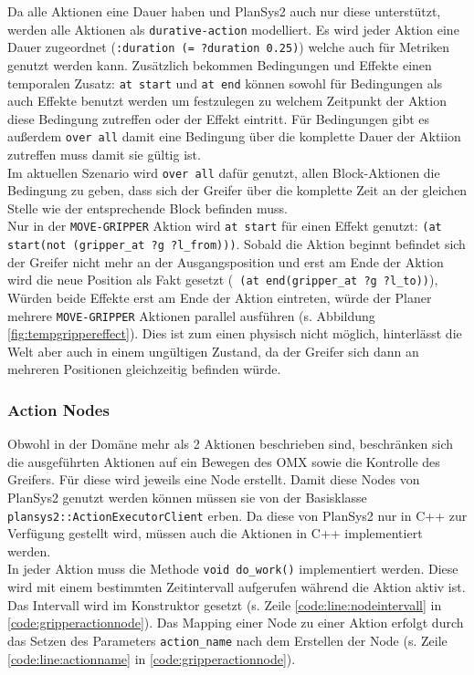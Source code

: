 Da alle Aktionen eine Dauer haben und \ac{PlanSys2} auch nur diese unterstützt, werden alle Aktionen als \verb|durative-action| modelliert. Es wird jeder Aktion eine Dauer zugeordnet (\verb|:duration (= ?duration 0.25)|) welche auch für Metriken genutzt werden kann. Zusätzlich bekommen Bedingungen und Effekte einen temporalen Zusatz: \verb|at start| und \verb|at end| können sowohl für Bedingungen als auch Effekte benutzt werden um festzulegen zu welchem Zeitpunkt der Aktion diese Bedingung zutreffen oder der Effekt eintritt. Für Bedingungen gibt es außerdem \verb|over all| damit eine Bedingung über die komplette Dauer der Aktiion zutreffen muss damit sie gültig ist.\\
Im aktuellen Szenario wird \verb|over all| dafür genutzt, allen Block-Aktionen die Bedingung zu geben, dass sich der Greifer über die komplette Zeit an der gleichen Stelle wie der entsprechende Block befinden muss.\\
Nur in der \verb|MOVE-GRIPPER| Aktion wird \verb|at start| für einen Effekt genutzt: \verb|(at start(not (gripper_at ?g ?l_from)))|. Sobald die Aktion beginnt befindet sich der Greifer nicht mehr an der Ausgangsposition und erst am Ende der Aktion wird die neue Position als Fakt gesetzt (\verb| (at end(gripper_at ?g ?l_to))|), Würden beide Effekte erst am Ende der Aktion eintreten, würde der Planer mehrere \verb|MOVE-GRIPPER| Aktionen parallel ausführen (s. Abbildung \ref{fig:tempgrippereffect}). Dies ist zum einen physisch nicht möglich, hinterlässt die Welt aber auch in einem ungültigen Zustand, da der Greifer sich dann an mehreren Positionen gleichzeitig befinden würde.
\subsubsection{Action Nodes}
Obwohl in der Domäne mehr als 2 Aktionen beschrieben sind, beschränken sich die ausgeführten Aktionen auf ein Bewegen des OMX sowie die Kontrolle des Greifers. Für diese wird jeweils eine Node erstellt. Damit diese Nodes von \ac{PlanSys2} genutzt werden können müssen sie von der Basisklasse \verb|plansys2::ActionExecutorClient| erben. Da diese von \ac{PlanSys2} nur in C++ zur Verfügung gestellt wird, müssen auch die Aktionen in C++ implementiert werden.\\
In jeder Aktion muss die Methode \verb|void do_work()| implementiert werden. Diese wird mit einem bestimmten Zeitintervall aufgerufen während die Aktion aktiv ist. Das Intervall wird im Konstruktor gesetzt (s. Zeile \ref{code:line:nodeintervall} in \ref{code:gripperactionnode}). Das Mapping einer Node zu einer Aktion erfolgt durch das Setzen des Parameters \verb|action_name| nach dem Erstellen der Node (s. Zeile \ref{code:line:actionname} in \ref{code:gripperactionnode}).
